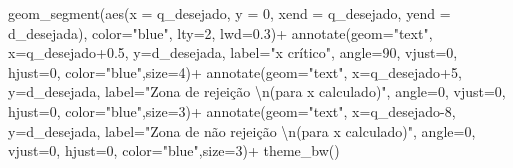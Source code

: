 \documentclass[
]{book}
\newenvironment{Shaded}{\begin{snugshade}}{\end{snugshade}}
\newcommand{\AttributeTok}[1]{\textcolor[rgb]{0.77,0.63,0.00}{#1}}
\newcommand{\DecValTok}[1]{\textcolor[rgb]{0.00,0.00,0.81}{#1}}
\newcommand{\FloatTok}[1]{\textcolor[rgb]{0.00,0.00,0.81}{#1}}
\newcommand{\FunctionTok}[1]{\textcolor[rgb]{0.00,0.00,0.00}{#1}}
\newcommand{\NormalTok}[1]{#1}
\newcommand{\SpecialCharTok}[1]{\textcolor[rgb]{0.00,0.00,0.00}{#1}}
\newcommand{\StringTok}[1]{\textcolor[rgb]{0.31,0.60,0.02}{#1}}
\begin{document}
\begin{Shaded}
\begin{Highlighting}[]
  \FunctionTok{geom\_segment}\NormalTok{(}\FunctionTok{aes}\NormalTok{(}\AttributeTok{x =}\NormalTok{ q\_desejado, }\AttributeTok{y =} \DecValTok{0}\NormalTok{, }\AttributeTok{xend =}\NormalTok{ q\_desejado, }\AttributeTok{yend =}\NormalTok{ d\_desejada), }\AttributeTok{color=}\StringTok{"blue"}\NormalTok{, }\AttributeTok{lty=}\DecValTok{2}\NormalTok{, }\AttributeTok{lwd=}\FloatTok{0.3}\NormalTok{)}\SpecialCharTok{+}
  \FunctionTok{annotate}\NormalTok{(}\AttributeTok{geom=}\StringTok{"text"}\NormalTok{, }\AttributeTok{x=}\NormalTok{q\_desejado}\FloatTok{+0.5}\NormalTok{, }\AttributeTok{y=}\NormalTok{d\_desejada, }\AttributeTok{label=}\StringTok{"x crítico"}\NormalTok{, }\AttributeTok{angle=}\DecValTok{90}\NormalTok{, }\AttributeTok{vjust=}\DecValTok{0}\NormalTok{, }\AttributeTok{hjust=}\DecValTok{0}\NormalTok{, }\AttributeTok{color=}\StringTok{"blue"}\NormalTok{,}\AttributeTok{size=}\DecValTok{4}\NormalTok{)}\SpecialCharTok{+}
 \FunctionTok{annotate}\NormalTok{(}\AttributeTok{geom=}\StringTok{"text"}\NormalTok{, }\AttributeTok{x=}\NormalTok{q\_desejado}\SpecialCharTok{+}\DecValTok{5}\NormalTok{, }\AttributeTok{y=}\NormalTok{d\_desejada, }\AttributeTok{label=}\StringTok{"Zona de rejeição }\SpecialCharTok{\textbackslash{}n}\StringTok{(para x calculado)"}\NormalTok{, }\AttributeTok{angle=}\DecValTok{0}\NormalTok{, }\AttributeTok{vjust=}\DecValTok{0}\NormalTok{, }\AttributeTok{hjust=}\DecValTok{0}\NormalTok{, }\AttributeTok{color=}\StringTok{"blue"}\NormalTok{,}\AttributeTok{size=}\DecValTok{3}\NormalTok{)}\SpecialCharTok{+}
  \FunctionTok{annotate}\NormalTok{(}\AttributeTok{geom=}\StringTok{"text"}\NormalTok{, }\AttributeTok{x=}\NormalTok{q\_desejado}\DecValTok{{-}8}\NormalTok{, }\AttributeTok{y=}\NormalTok{d\_desejada, }\AttributeTok{label=}\StringTok{"Zona de não rejeição  }\SpecialCharTok{\textbackslash{}n}\StringTok{(para x calculado)"}\NormalTok{, }\AttributeTok{angle=}\DecValTok{0}\NormalTok{, }\AttributeTok{vjust=}\DecValTok{0}\NormalTok{, }\AttributeTok{hjust=}\DecValTok{0}\NormalTok{, }\AttributeTok{color=}\StringTok{"blue"}\NormalTok{,}\AttributeTok{size=}\DecValTok{3}\NormalTok{)}\SpecialCharTok{+}
  \FunctionTok{theme\_bw}\NormalTok{()}
\end{Highlighting}
\end{Shaded}
\end{document}
